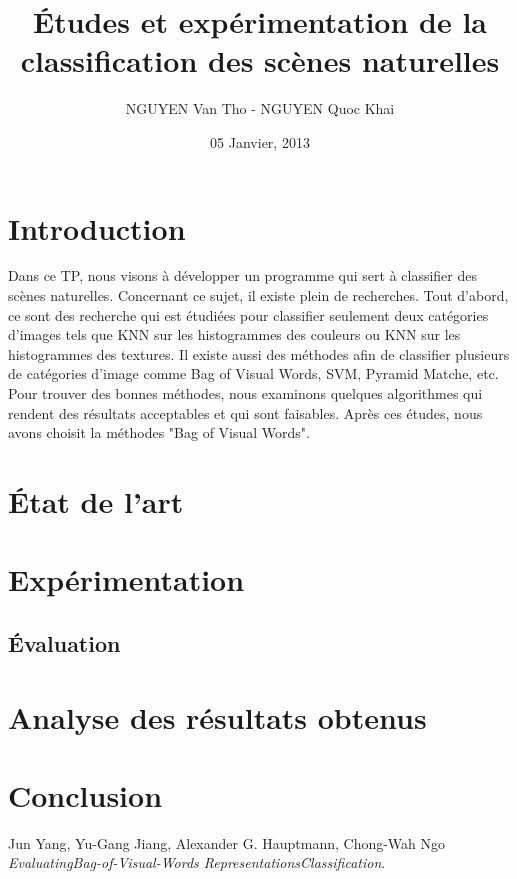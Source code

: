 \documentclass[]{article}   %
\begin{document}
\title{Études et expérimentation de la classification des scènes naturelles}   %
\author{NGUYEN Van Tho - NGUYEN Quoc Khai}         %
\date{05 Janvier, 2013}    %
\maketitle

\section{Introduction}
Dans ce TP, nous visons à développer un programme qui sert à classifier des scènes naturelles. Concernant ce sujet, il existe plein de recherches. Tout d'abord, ce sont des recherche qui est étudiées pour classifier seulement deux catégories d'images tels que KNN sur les histogrammes des couleurs ou KNN sur les histogrammes des textures. Il existe aussi des méthodes afin de classifier plusieurs de catégories d'image comme Bag of Visual Words, SVM, Pyramid Matche, etc.\\

Pour trouver des bonnes méthodes, nous examinons quelques algorithmes qui rendent des résultats acceptables et qui sont faisables. Après ces études, nous avons choisit la méthodes "Bag of Visual Words".

\section{État de l'art}

\section{Expérimentation}

\subsection{Évaluation}

\section{Analyse des résultats obtenus}

\section{Conclusion}

\begin{thebibliography}{9}
  Jun Yang, Yu-Gang Jiang, Alexander G. Hauptmann, Chong-Wah Ngo
  \emph{EvaluatingBag-of-Visual-Words RepresentationsClassification}.
 
\end{thebibliography}
\end{document}
